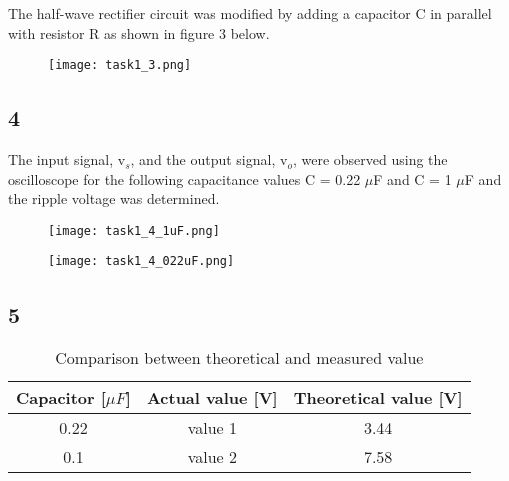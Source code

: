     The half-wave rectifier circuit was modified by adding a capacitor C in parallel with resistor R as shown in figure 3 below.

    \begin{figure}[h!]
        \centering
        \texttt{[image: task1\_3.png]}
    \end{figure}

\subsection*{4}
    
    The input signal, v$_s$, and the output signal, v$_o$, were observed using the oscilloscope for the following capacitance values C = 0.22 $\mu$F and C = 1 $\mu$F and the ripple voltage was determined.\\

    \begin{figure}[h!]
        \centering
        \texttt{[image: task1\_4\_1uF.png]}
    \end{figure}

    \begin{figure}[h!]
        \centering
        \texttt{[image: task1\_4\_022uF.png]}
    \end{figure}

\subsection*{5}
    
   \begin{table}[htbp]
     \centering
     \caption{Comparison between theoretical and measured value}
       \begin{tabular}{c|c|c}
       Capacitor [$\mu F$] & Actual value [V] & Theoretical value [V] \\
       \hline
       0.22         &      value 1        & 3.44 \\
       0.1          &      value 2        & 7.58 \\
       
       \end{tabular}%
     \label{tab:addlabel}%
   \end{table}%


    




